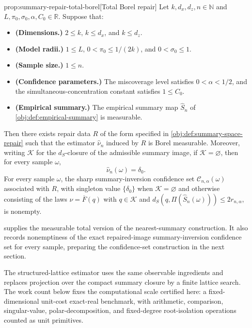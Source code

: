 \documentclass[11pt]{article}
\begin{document}
\begin{propositionv}{prop:summary-repair-total-borel}[Total Borel repair]
Let \(k,d_x,d_z,n\in\mathbb N\) and \(L,\pi_0,\sigma_0,\alpha,C_0\in\mathbb R\).  Suppose that:
\begin{itemize}
\item \textbf{(Dimensions.)} \(2\le k\), \(k\le d_x\), and \(k\le d_z\).
\item \textbf{(Model radii.)} \(1\le L\), \(0<\pi_0\le 1/(2k)\), and \(0<\sigma_0\le 1\).
\item \textbf{(Sample size.)} \(1\le n\).
\item \textbf{(Confidence parameters.)} The miscoverage level satisfies \(0<\alpha<1/2\), and the simultaneous-concentration constant satisfies \(1\le C_0\).
\item \textbf{(Empirical summary.)} The empirical summary map \(\widehat S_n\) of \cref{obj:def:empirical-summary} is measurable.
\end{itemize}
Then there exists repair data \(R\) of the form specified in \cref{obj:def:summary-space-repair} such that the estimator \(\widehat\nu_n\) induced by \(R\) is Borel measurable.  Moreover, writing \(\mathcal K\) for the \(d_S\)-closure of the admissible summary image, if \(\mathcal K=\varnothing\), then for every sample \(\omega\),
\[
\widehat\nu_n(\omega)=\delta_0.
\]
For every sample \(\omega\), the sharp summary-inversion confidence set \(\mathcal C_{n,\alpha}(\omega)\) associated with \(R\), with singleton value \(\{\delta_0\}\) when \(\mathcal K=\varnothing\) and otherwise consisting of the laws \(\nu=\overline F(q)\) with \(q\in\mathcal K\) and \(d_S(q,\Pi(\widehat S_n(\omega)))\le 2r_{n,\alpha}\), is nonempty.
\end{propositionv}

 supplies the measurable total version of the nearest-summary construction. It also records nonemptiness of the exact repaired-image summary-inversion confidence set for every sample, preparing the confidence-set construction in the next section.

The structured-lattice estimator uses the same observable ingredients and replaces projection over the compact summary closure by a finite lattice search. The work count below fixes the computational scale certified here: a fixed-dimensional unit-cost exact-real benchmark, with arithmetic, comparison, singular-value, polar-decomposition, and fixed-degree root-isolation operations counted as unit primitives.
\end{document}
